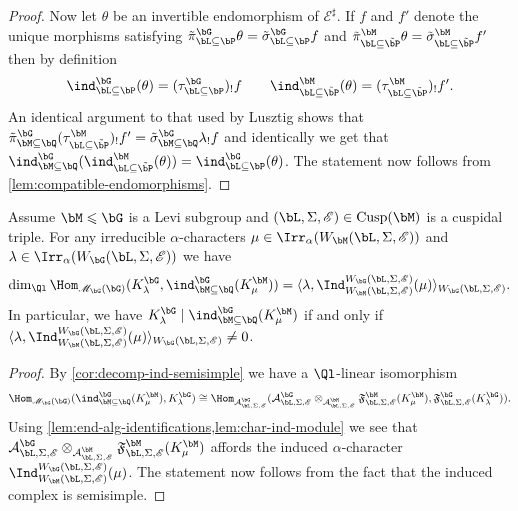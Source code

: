 \documentclass[eqthmnum,nocolour,skinny]{jt-calcs}
\DeclareMathOperator{\Cusp}{Cusp}
\begin{document}
\begin{proof}
Now let $\theta$ be an invertible endomorphism of $\mathscr{E}^{\sharp}$. If $f$ and $f'$ denote the unique morphisms satisfying $\tilde{\pi}_{\bL\subseteq\bP}^{\bG}\theta = \tilde{\sigma}_{\bL\subseteq\bP}^{\bG}f$ and $\tilde{\pi}_{\bL\subseteq\tilde{\bP}}^{\bM}\theta = \tilde{\sigma}_{\bL\subseteq\tilde{\bP}}^{\bM}f'$ then by definition
\begin{equation*}
\ind_{\bL \subseteq \bP}^{\bG}(\theta) = (\tau_{\bL\subseteq\bP}^{\bG})_!f \qquad \ind_{\bL \subseteq \tilde{\bP}}^{\bM}(\theta) = (\tau_{\bL\subseteq\tilde{\bP}}^{\bM})_!f'.
\end{equation*}
An identical argument to that used by Lusztig shows that $\tilde{\pi}_{\bM\subseteq\bQ}^{\bG}(\tau_{\bL\subseteq\tilde{\bP}}^{\bM})_!f' = \tilde{\sigma}_{\bM\subseteq\bQ}^{\bG}\lambda_!f$ and identically we get that $\ind_{\bM \subseteq \bQ}^{\bG}(\ind_{\bL \subseteq \tilde{\bP}}^{\bM}(\theta)) = \ind_{\bL \subseteq \bP}^{\bG}(\theta)$. The statement now follows from \cref{lem:compatible-endomorphisms}.
\end{proof}

\begin{cor}\label{prop:comparison-theorem}
Assume $\bM \leqslant \bG$ is a Levi subgroup and $(\bL,\Sigma,\mathscr{E}) \in \Cusp(\bM)$ is a cuspidal triple. For any irreducible $\alpha$-characters $\mu \in \Irr_{\alpha}(W_{\bM}(\bL,\Sigma,\mathscr{E}))$ and $\lambda \in \Irr_{\alpha}(W_{\bG}(\bL,\Sigma,\mathscr{E}))$ we have
\begin{equation*}
\dim_{\Ql} \Hom_{\mathscr{M}_{\bG}(\bG)}(K_{\lambda}^{\bG},\ind_{\bM\subseteq \bQ}^{\bG}(K_{\mu}^{\bM})) = \langle \lambda, \Ind_{W_{\bM}(\bL,\Sigma,\mathscr{E})}^{W_{\bG}(\bL,\Sigma,\mathscr{E})}(\mu)\rangle_{W_{\bG}(\bL,\Sigma,\mathscr{E})}.
\end{equation*}
In particular, we have $K_{\lambda}^{\bG} \mid \ind_{\bM\subseteq \bQ}^{\bG}(K_{\mu}^{\bM})$ if and only if $\langle \lambda, \Ind_{W_{\bM}(\bL,\Sigma,\mathscr{E})}^{W_{\bG}(\bL,\Sigma,\mathscr{E})}(\mu)\rangle_{W_{\bG}(\bL,\Sigma,\mathscr{E})} \neq 0$.
\end{cor}

\begin{proof}
By \cref{cor:decomp-ind-semisimple} we have a $\Ql$-linear isomorphism
\begin{equation*}
\Hom_{\mathscr{M}_{\bG}(\bG)}(\ind_{\bM\subseteq\bQ}^{\bG}(K_{\mu}^{\bM}),K_{\lambda}^{\bG}) \cong \Hom_{\mathcal{A}_{\bL,\Sigma,\mathscr{E}}^{\bG}}(\mathcal{A}_{\bL,\Sigma,\mathscr{E}}^{\bG} \otimes_{\mathcal{A}_{\bL,\Sigma,\mathscr{E}}^{\bM}} \mathfrak{F}_{\bL,\Sigma,\mathscr{E}}^{\bM}(K_{\mu}^{\bM}),\mathfrak{F}_{\bL,\Sigma,\mathscr{E}}^{\bG}(K_{\lambda}^{\bG})).
\end{equation*}
Using \cref{lem:end-alg-identifications,lem:char-ind-module} we see that $\mathcal{A}_{\bL,\Sigma,\mathscr{E}}^{\bG} \otimes_{\mathcal{A}_{\bL,\Sigma,\mathscr{E}}^{\bM}} \mathfrak{F}_{\bL,\Sigma,\mathscr{E}}^{\bM}(K_{\mu}^{\bM})$ affords the induced $\alpha$-character $\Ind_{W_{\bM}(\bL,\Sigma,\mathscr{E})}^{W_{\bG}(\bL,\Sigma,\mathscr{E})}(\mu)$. The statement now follows from the fact that the induced complex is semisimple.
\end{proof}
\end{document}
